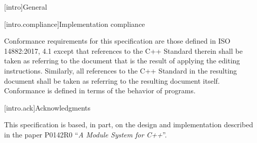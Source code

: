 
[intro]{General}


[intro.compliance]{Implementation compliance}

\pnum
Conformance requirements for this specification are those 
defined in ISO 14882:2017, 4.1
except that references to the C++ Standard therein shall
be taken as referring to the document that is the result
of applying the editing instructions.  Similarly, all references
to the C++ Standard in the resulting document shall be taken
as referring to the resulting document itself.
\enternote 
Conformance is defined in terms of the behavior of programs.
\exitnote








[intro.ack]{Acknowledgments}


\pnum
This specification is based, in part, on the design and implementation
described in the paper P0142R0 ``\emph{A Module System for C++}''.
